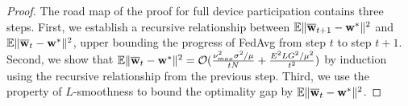 \begin{proof}
	The road map of the proof for full device participation contains three steps. First, we establish a recursive relationship between $\mathbb{E}\|{\overline{\mathbf{w}}}_{t+1}-{\mathbf{w}}^{\ast}\|^{2}$
	and $\mathbb{E}\|{\overline{\mathbf{w}}}_{t}-{\mathbf{w}}^{\ast}\|^{2}$, upper bounding the progress of FedAvg from step $t$ to step $t+1$. 
	Second, we show that $\mathbb{E}\|{\overline{\mathbf{w}}}_{t}-{\mathbf{w}}^{\ast}\|^{2}=\mathcal{O}(\frac{\nu_{max}^{2}\sigma^{2}/\mu}{tN}+\frac{E^{2}LG^{2}/\mu^2}{t^{2}})$ by induction using the recursive relationship from the previous step. 
	Third, we use the property of $L$-smoothness to bound the optimality gap by $\mathbb{E}\|{\overline{\mathbf{w}}}_{t}-{\mathbf{w}}^{\ast}\|^{2}$. 
	

\end{proof}
